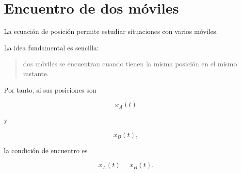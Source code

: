 \section{Encuentro de dos móviles}

La ecuación de posición permite estudiar situaciones con varios móviles.

La idea fundamental es sencilla:

\begin{quote}
dos móviles se encuentran cuando tienen la misma posición en el mismo
instante.
\end{quote}

Por tanto, si sus posiciones son

\[ x_A(t) \]

y

\[ x_B(t), \]

la condición de encuentro es

\[ \boxed{x_A(t)=x_B(t)}. \]


